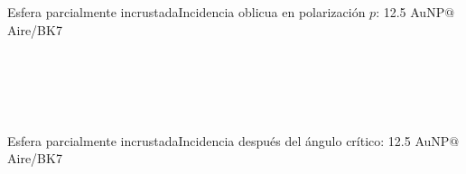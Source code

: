      \begin{frame}{Esfera parcialmente incrustada}{Incidencia oblicua en polarización $p$: 12.5 AuNP$@$Aire/BK7}\fontsize{4.5}{5.5}\selectfont
      \renewcommand{\newcirc}{{\scaleobj{.625}{\circ}}}
      \begin{columns}
      	\begin{figure} \centering
          \def\svgwidth{.85\textwidth}
          \\[1em]
          \def\svgwidth{.85\textwidth}
      \end{figure}
      	\begin{figure} \centering
          \def\svgwidth{.85\textwidth}
          \\[1em]
          \def\svgwidth{.85\textwidth}
      \end{figure}
      \end{columns}
      \end{frame}
      \begin{frame}{Esfera parcialmente incrustada}{Incidencia después del ángulo crítico: 12.5 AuNP$@$Aire/BK7}%
      \renewcommand{\newcirc}{{\scaleobj{.625}{\circ}}}
      \begin{columns}\fontsize{4}{5}\selectfont
      	\begin{figure} \centering
          \def\svgwidth{.85\textwidth}
          \\[1em]
          \def\svgwidth{.85\textwidth}
      \end{figure}
      \renewcommand{\newcirc}{{\scaleobj{.625}{\circ}}}
      \begin{figure}\centering
        \def\svgwidth{.8\textwidth}\vspace*{-2em} \fontsize{4}{5}
      \end{figure}
      \end{columns}
      \end{frame}

